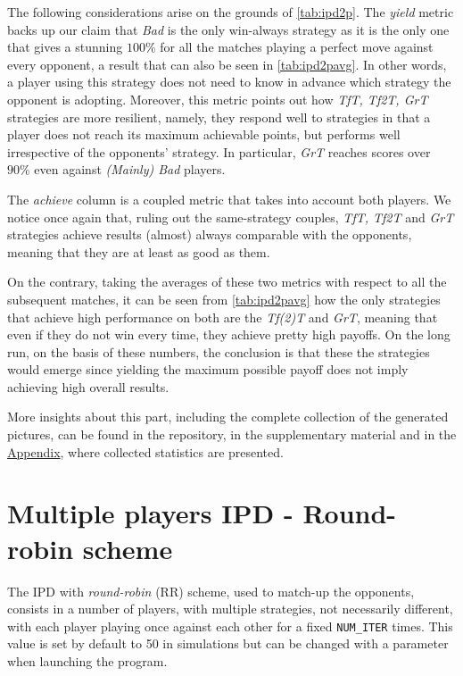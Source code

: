 \documentclass[journal,10pt,twoside]{IEEEtran}
\begin{document}
The following considerations arise on the grounds of \autoref{tab:ipd2p}.
The \textit{yield} metric backs up our claim that \textit{Bad} is the only win-always strategy as it is the only one that gives a stunning $100\%$ for all the matches playing a perfect move against every opponent, a result that can also be seen in \autoref{tab:ipd2pavg}. In other words, a player using this strategy does not need to know in advance which strategy the opponent is adopting. Moreover, this metric points out how \textit{TfT, Tf2T, GrT} strategies are more resilient, namely, they respond well to strategies in that a player does not reach its maximum achievable points, but performs well irrespective of the opponents' strategy. In particular, \textit{GrT} reaches scores over $90\%$ even against \textit{(Mainly) Bad} players.

The \textit{achieve} column is a coupled metric that takes into account both players. We notice once again that, ruling out the same-strategy couples, \textit{TfT, Tf2T} and \textit{GrT} strategies achieve results (almost) always comparable with the opponents, meaning that they are at least as good as them.

On the contrary, taking the averages of these two metrics with respect to all the subsequent matches, it can be seen from \autoref{tab:ipd2pavg} how the only strategies that achieve high performance on both are the \textit{Tf(2)T} and \textit{GrT}, meaning that even if they do not win every time, they achieve pretty high payoffs.
On the long run, on the basis of these numbers, the conclusion is that these the strategies would emerge since yielding the maximum possible payoff does not imply achieving high overall results.

More insights about this part, including the complete collection of the generated pictures, can be found in the repository, in the supplementary material and in the \hyperref[s:appendix]{Appendix}, where collected statistics are presented.

\section{Multiple players IPD - Round-robin scheme} \label{s:IPDMP}
The IPD with \textit{round-robin} (RR) scheme, used to match-up the opponents, consists in a number of players, with multiple strategies, not necessarily different, with each player playing once against each other for a fixed \texttt{NUM\_ITER} times. This value is set by default to 50 in simulations but can be changed with a parameter when launching the program.
\end{document}
